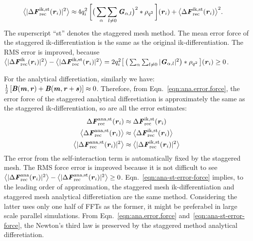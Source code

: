 \documentclass[aps,pre,preprint]{revtex4}
\renewcommand{\v}[1]{\textbf{\textit{#1}}}
\begin{document}
\begin{align}\label{eqn:ik.st.error}
  \big\langle
  \vert\Delta\v F_{\textrm{rec}}^{\textrm{ik,st}}(\v r_i)\vert^2
  \big\rangle
  \approx&\,
  4q_i^2\,
  \bigg[
  \big(
  \sum_{\alpha} \sum_{l\neq 0}  
  \v G_{\alpha,l}
  \big)^2
  \ast \rho_{q^2}\,
  \bigg] (\v r_i) +
  \big\langle
  \Delta\v F_{\textrm{rec}}^{\textrm{ik,st}}(\v r_i)
  \big\rangle^2.
\end{align}
The superscript ``st'' denotes the staggered mesh method.
The mean error force of the staggered ik-differentiation is the
same as the original ik-differentiation.
The RMS error is improved, because
$\big\langle\vert\Delta\v F_{\textrm{rec}}^{\textrm{ik}}(\v r_i)\vert^2\big\rangle -
\big\langle\vert\Delta\v F_{\textrm{rec}}^{\textrm{ik,st}}(\v r_i)\vert^2\big\rangle=
2q_i^2
\big[\,
\big(
\sum_{\alpha} \sum_{l\neq 0}
\vert \v G_{\alpha,l}\vert^2
\big)
\ast \rho_{q^2}
\,\big] (\v r_i) \geq 0$.

For the analytical differetiation, similarly we have: $\frac12\,[\v
B(\v m,\v r) + \v B(\v m, \v r+\v s)] \approx 0$. Therefore, from
Eqn.~\eqref{eqn:ana.error.force}, the error force of the staggered
analytical differetiation is approximately the same as the staggered
ik-differentiation, so are all the error estimates:
\begin{align}\label{eqn:ana-st-error-force}
  \Delta\v F^{\textrm{ana,st}}_{\textrm{rec}}(\v r_i)
  &\approx
  \Delta\v F^{\textrm{ik,st}}_{\textrm{rec}}(\v r_i)\\
  \big\langle
  \Delta\v F_{\textrm{rec}}^{\textrm{ana,st}}(\v r_i)
  \big\rangle
  &\approx
  \big\langle
  \Delta\v F_{\textrm{rec}}^{\textrm{ik,st}}(\v r_i)
  \big\rangle\\
  \big\langle
  \vert\Delta\v F_{\textrm{rec}}^{\textrm{ana,st}}(\v r_i)\vert^2
  \big\rangle
  &\approx
  \big\langle
  \vert\Delta\v F_{\textrm{rec}}^{\textrm{ik,st}}(\v r_i)\vert^2
  \big\rangle
\end{align}
The error from the self-interaction term is automatically fixed by the
staggered mesh.
The RMS force error is improved because it is not
difficult to see 
$\big\langle\vert\Delta\v F_{\textrm{rec}}^{\textrm{ana}}(\v r_i)\vert^2\big\rangle -
\big\langle\vert\Delta\v F_{\textrm{rec}}^{\textrm{ana,st}}(\v r_i)\vert^2\big\rangle
\geq 0$.
Eqn.~\eqref{eqn:ana-st-error-force} implies, to the
leading order of approximation, the staggered
mesh ik-differentiation and staggered mesh analytical differetiation
are the same method. Considering the latter uses
only one half of  FFTs as the former, it might be preferabel
in large scale parallel simulations.
From Eqn.~\eqref{eqn:ana.error.force}
and~\eqref{eqn:ana-st-error-force}, the Newton's
third law is preserved by the staggered method analytical differetiation.
\end{document}
